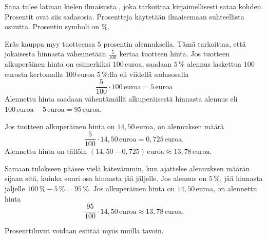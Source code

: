 Sana  tulee latinan kielen ilmaisusta , joka tarkoittaa kirjaimellisesti sataa kohden. Prosentit ovat siis sadasosia. Prosentteja käytetään ilmaisemaan suhteellista osuutta. Prosentin symboli on \%.


\begin{esimerkki}

\begin{esimratk}
\end{esimratk}
\end{esimerkki}


\begin{esimerkki}
Eräs kauppa myy tuotteensa $5$ prosentin alennuksella. Tämä tarkoittaa, että jokaisesta hinnasta vähennetään $\frac{5}{100}$ kertaa tuotteen hinta. Jos tuotteen alkuperäinen hinta on esimerkiksi $100$\,euroa, saadaan $5\,\%$ alennus laskettua $100$\,eurosta kertomalla $100$\,euroa $5\,\%$:lla eli viidellä sadasosalla 
\[
\frac{5}{100} \cdot 100\,\text{euroa} = 5\,\text{euroa}
\]
Alennettu hinta saadaan vähentämällä alkuperäisestä hinnasta alennus eli $100\,\text{euroa} - 5\,\text{euroa} = 95\,\text{euroa}$.

Jos tuotteen alkuperäinen hinta on $14,50$\,euroa, on alennuksen määrä
\[
	\frac{5}{100} \cdot 14,50\,\text{euroa} = 0,725\,\text{euroa}.
\]
Alennettu hinta on tällöin $(14,50 - 0,725)\,\text{euroa} \approx 13,78\,\text{euroa}$.

Samaan tulokseen pääsee vielä kätevämmin, kun ajattelee alennuksen määrän sijaan sitä, kuinka suuri osa hinnasta jää jäljelle. Jos alennus on $5\,\%$, jää hinnasta jäljelle $100\,\% - 5\,\% = 95\,\%$. Jos alkuperäinen hinta on $14,50$\,euroa, on alennettu hinta 
\[
	\frac{95}{100} \cdot 14,50\,\text{euroa} \approx 13,78\,\text{euroa}.
\]
\end{esimerkki}

\begin{esimerkki}
    Prosenttiluvut voidaan esittää myös muilla tavoin.
\end{esimerkki}

